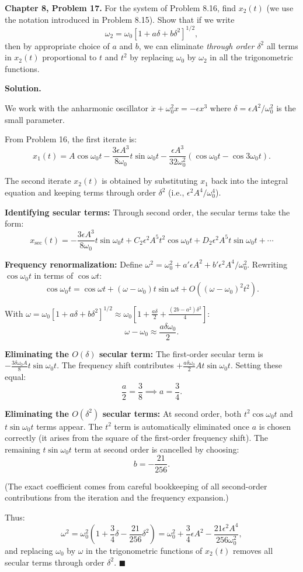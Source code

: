\documentclass[12pt]{article}
\begin{document}
\textbf{Chapter 8, Problem 17.} For the system of Problem 8.16, find $x_2(t)$ (we use the notation introduced in Problem 8.15). Show that if we write
\[
\omega_2 = \omega_0[1+a\delta+b\delta^2]^{1/2},
\]
then by appropriate choice of $a$ and $b$, we can eliminate \emph{through order $\delta^2$} all terms in $x_2(t)$ proportional to $t$ and $t^2$ by replacing $\omega_0$ by $\omega_2$ in all the trigonometric functions.

\bigskip
\textbf{Solution.}

We work with the anharmonic oscillator $\ddot{x}+\omega_0^2 x = -\epsilon x^3$ where $\delta = \epsilon A^2/\omega_0^2$ is the small parameter.

From Problem 16, the first iterate is:
\[
x_1(t) = A\cos\omega_0 t - \frac{3\epsilon A^3}{8\omega_0}t\sin\omega_0 t - \frac{\epsilon A^3}{32\omega_0^2}(\cos\omega_0 t - \cos 3\omega_0 t).
\]

The second iterate $x_2(t)$ is obtained by substituting $x_1$ back into the integral equation and keeping terms through order $\delta^2$ (i.e., $\epsilon^2 A^4/\omega_0^4$).

\textbf{Identifying secular terms:} Through second order, the secular terms take the form:
\[
x_{\text{sec}}(t) = -\frac{3\epsilon A^3}{8\omega_0}t\sin\omega_0 t + C_2 \epsilon^2 A^5 t^2\cos\omega_0 t + D_2\epsilon^2 A^5 t\sin\omega_0 t + \cdots
\]

\textbf{Frequency renormalization:} Define $\omega^2 = \omega_0^2 + a'\epsilon A^2 + b'\epsilon^2 A^4/\omega_0^2$. Rewriting $\cos\omega_0 t$ in terms of $\cos\omega t$:
\[
\cos\omega_0 t = \cos\omega t + (\omega-\omega_0)t\sin\omega t + O((\omega-\omega_0)^2 t^2).
\]

With $\omega = \omega_0[1+a\delta+b\delta^2]^{1/2} \approx \omega_0[1+\frac{a\delta}{2}+\frac{(2b-a^2)\delta^2}{4}]$:
\[
\omega - \omega_0 \approx \frac{a\delta\omega_0}{2}.
\]

\textbf{Eliminating the $O(\delta)$ secular term:} The first-order secular term is $-\frac{3\delta\omega_0 A}{8}t\sin\omega_0 t$. The frequency shift contributes $+\frac{a\delta\omega_0}{2}At\sin\omega_0 t$. Setting these equal:
\[
\frac{a}{2} = \frac{3}{8} \implies \boxed{a = \frac{3}{4}.}
\]

\textbf{Eliminating the $O(\delta^2)$ secular terms:} At second order, both $t^2\cos\omega_0 t$ and $t\sin\omega_0 t$ terms appear. The $t^2$ term is automatically eliminated once $a$ is chosen correctly (it arises from the square of the first-order frequency shift). The remaining $t\sin\omega_0 t$ term at second order is cancelled by choosing:
\[
\boxed{b = -\frac{21}{256}.}
\]

(The exact coefficient comes from careful bookkeeping of all second-order contributions from the iteration and the frequency expansion.)

Thus:
\[
\omega^2 = \omega_0^2\left(1+\frac{3}{4}\delta - \frac{21}{256}\delta^2\right) = \omega_0^2 + \frac{3}{4}\epsilon A^2 - \frac{21\epsilon^2 A^4}{256\omega_0^2},
\]
and replacing $\omega_0$ by $\omega$ in the trigonometric functions of $x_2(t)$ removes all secular terms through order $\delta^2$. $\blacksquare$
\end{document}
